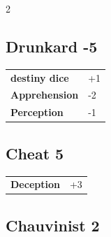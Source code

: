 \begin{multicols}{2}
\begin{tcolorbox}

\end{tcolorbox}

\begin{tcolorbox}
    \subsection*{Drunkard \hfill \small{-5 }}
    \tcblower




\begin{tabular}{@{}ll@{}}
    \textbf{destiny dice} & +1\\
    \textbf{Apprehension} & -2\\
    \textbf{Perception} & -1\\
\end{tabular}


\end{tcolorbox}

\begin{tcolorbox}
    \subsection*{Cheat \hfill \small{5 }}
    \tcblower




\begin{tabular}{@{}ll@{}}
    \textbf{Deception} & +3\\
\end{tabular}


\end{tcolorbox}

\begin{tcolorbox}
    \subsection*{Chauvinist \hfill \small{2 }}
    \tcblower





\end{tcolorbox}
\end{multicols}
